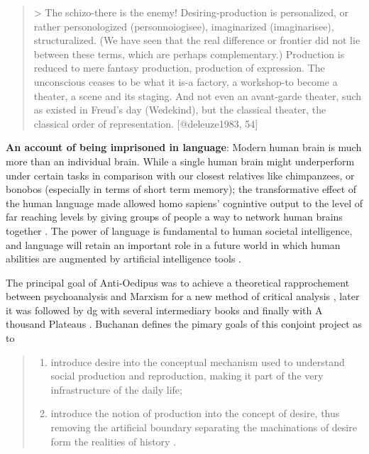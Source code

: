 \begin{tcolorbox}
\begin{todolist}
		\begin{quote}
			> The schizo-there is the enemy! Desiring-production is personalized, or rather personologized (personnoiogisee), imaginarized (imaginarisee), structuralized. (We have seen that the real difference or frontier did not lie between these terms, which are perhaps complementary.) Production is reduced to mere fantasy production, production of expression. The unconscious ceases to be what it is-a factory, a workshop-to become a theater, a scene and its staging. And not even an avant-garde theater, such as existed in Freud's day (Wedekind), but the classical theater, the classical order of representation. [@deleuze1983, 54]
		\end{quote}

		\item \textbf{An account of being imprisoned in language}:
		Modern human brain is much more than an individual brain. While a single
		human brain might underperform under certain tasks in comparison with our
		closest relatives like chimpanzees, or bonobos (especially in terms of
		short term memory); the transformative effect of the human language made
		allowed homo sapiens' cognintive output to the level of far reaching levels by giving groups of people a way to network human brains together \parencite[see 127]{manning2022a} . The power of language is fundamental to human societal intelligence, and language will retain an important role in a future world in which human abilities are augmented by artificial intelligence tools \parencite[127]{manning2022a}.

	\end{todolist}
\end{tcolorbox}


The principal goal of Anti-Oedipus \cite*{deleuze1983} was to achieve a theoretical rapprochement between psychoanalysis and Marxism for a new method of critical analysis \parencite[39]{buchanan2008b}, later it was followed by \gls{dg} with several intermediary books and finally with A thousand Plateaus \cite*{deleuze1987}. Buchanan \parencite*{buchanan2008b} defines the pimary goals of this conjoint project as to
\begin{quote}
	\begin{enumerate}
		\item introduce desire into the conceptual mechanism used to understand social production and reproduction, making it part of the very infrastructure of the daily life;
		\item introduce the notion of production into the concept  of desire,  thus removing the artificial boundary separating the machinations of desire form the realities of history \cite[39-42]{buchanan2008b}.
	\end{enumerate}
\end{quote}

